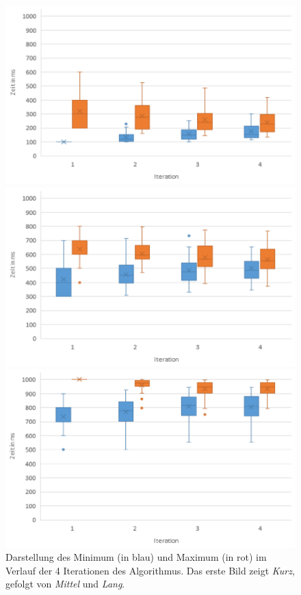 \begin{figure}[htbp] 
	\centering
	\begin{minipage}[t]{0.8\textwidth}
		\includegraphics[width=\textwidth]{pics/analyse/algo/MinMax/sonstige/KurzMinMax2.png}
	\end{minipage}
	\begin{minipage}[t]{0.8\textwidth}
		\includegraphics[width=\textwidth]{pics/analyse/algo/MinMax/sonstige/MittelMinMax2.png}
	\end{minipage}
\begin{minipage}[t]{0.8\textwidth}
		\includegraphics[width=\textwidth]{pics/analyse/algo/MinMax/sonstige/LangMinMax2.png}
	\end{minipage}
	\caption{Darstellung des Minimum (in blau) und Maximum (in rot) im Verlauf der 4 Iterationen des Algorithmus. Das erste Bild zeigt \textit{Kurz}, gefolgt von \textit{Mittel} und \textit{Lang}.}
	\label{fig:MinMaxSignale}
\end{figure}

